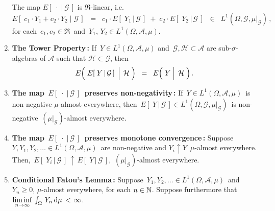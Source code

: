 \begin{theorem}
\begin{enumerate}
	The map $E\!\left[\;\cdot\;\vert\,\mathcal{G}\,\right]$ is $\Re$-linear, i.e.
	\begin{equation*}
	E\!\left[\;c_{1}\cdot Y_{1} + c_{2}\cdot Y_{2}\;\vert\;\mathcal{G}\,\right]
	\;\; = \;\;
	c_{1}\cdot E\!\left[\;Y_{1}\,\vert\,\mathcal{G}\,\right]
	\; + \;
	c_{2}\cdot E\!\left[\;Y_{2}\,\vert\,\mathcal{G}\,\right]
	\;\; \in \;\; L^{1}\!\left(\Omega,\mathcal{G},\mu\vert_{\mathcal{G}}\right)
	\,,
	\end{equation*}
	for each \,$c_{1}, c_{2} \in \Re$\, and \,$Y_{1}, \, Y_{2} \in L^{1}\!\left(\Omega,\mathcal{A},\mu\right)$.
\item\label{ConditionalExpectationTowerProperty}
	\textbf{The Tower Property\,:}
	\vskip 0.0cm
	If \,$Y \in L^{1}\!\left(\Omega,\mathcal{A},\mu\right)$
	and \,$\mathcal{G}, \mathcal{H} \subset \mathcal{A}$ are sub-$\sigma$-algebras of $\mathcal{A}$
	such that $\mathcal{H} \subset \mathcal{G}$, then
	\begin{equation*}
	E\!\left(\,\left.\overset{{\color{white}.}}{E}\!\left[\;Y\,\vert\,\mathcal{G}\,\right]\;\,\right\vert\;\mathcal{H}\;\right)
	\;\; = \;\;
	E\!\left(\,\left.\overset{{\color{white}.}}{Y}\;\right\vert\;\mathcal{H}\;\right).
	\end{equation*}	
\item\label{ConditionalExpectationPreservesNonnegativity}
	\textbf{The map \,$E\!\left[\;\cdot\;\vert\,\mathcal{G}\,\right]$\, preserves non-negativity\,:}
	\vskip 0.0cm
	If \,$Y \in L^{1}\!\left(\Omega,\mathcal{A},\mu\right)$\,
	is non-negative $\mu$-almost everywhere, then
	\,$E\!\left[\;Y\,\vert\,\mathcal{G}\,\right] \in L^{1}\!\left(\Omega,\mathcal{G},\mu\vert_{\mathcal{G}}\right)$\,
	is non-negative \,$(\mu\vert_{\mathcal{G}})$-almost everywhere.
\item\label{ConditionalMonotoneConvergence}
	\textbf{The map \,$E\!\left[\;\cdot\;\vert\,\mathcal{G}\,\right]$\, preserves monotone convergence\,:}
	\vskip 0.0cm
	Suppose \,$Y, Y_{1}, Y_{2}, \ldots \in L^{1}(\Omega,\mathcal{A},\mu)$\,
	are non-negative and
	\;$Y_{i} \uparrow Y$\,
	$\mu$-almost everywhere.
	\vskip 0.0cm
	Then, \,$E\!\left[\;Y_{i}\,\vert\,\mathcal{G}\,\right] \,\uparrow\, E\!\left[\;Y\,\vert\,\mathcal{G}\,\right]$,\,
	$(\mu\vert_{\mathcal{G}})$-almost everywhere.	
\item\label{ConditionalFatousLemma}
	\textbf{Conditional Fatou's Lemma\,:}
	\vskip 0.0cm
	Suppose \,$Y_{1}, Y_{2}, \ldots \in L^{1}(\Omega,\mathcal{A},\mu)$\, and
	\,$Y_{n} \geq 0$, $\mu$-almost everywhere, for each $n \in \mathbb{N}$.
	Suppose furthermore that
	\,$\underset{n\rightarrow\infty}{\liminf}\,\int_{\Omega}\, Y_{n} \,\textnormal{d}\mu \,<\, \infty$.\,

\end{enumerate}
\end{theorem}
